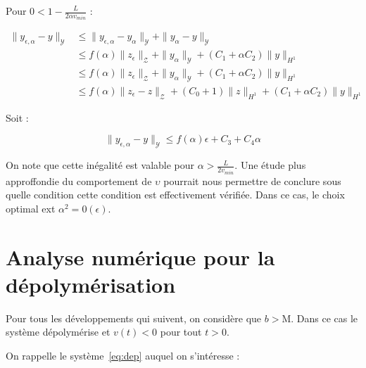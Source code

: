 \documentclass[a4paper]{article}
\newcommand{\mass}{\mathrm{M}}
\newcommand{\dep}{b}
\newcommand{\Y}{\mathscr{Y}}
\newcommand{\Z}{\mathscr{Z}}
\newcommand{\yea}{y_{\epsilon, \alpha}}
\begin{document}
Pour $0< 1-\displaystyle \frac{L}{2\alpha v_{min}} $ :

\[
\begin{split}
	\| \yea - y \|_{\Y} & \leq \| \yea - y_\alpha \|_{\Y} + \| y_\alpha - y \|_{\Y}\\ 	                                             & \leq f(\alpha) \| z_\epsilon \|_{\Z} 
	                          + \| y_\alpha \|_{\Y} + (C_1 + \alpha C_2) \| y \|_{H^1}\\
	                    & \leq f(\alpha) \| z_\epsilon \|_{\Z} + \| y_\alpha \|_{\Y} 
						      + (C_1 + \alpha C_2) \| y \|_{H^1}\\
	  	              & \leq f(\alpha) \| z_\epsilon - z \|_{\Z} 
					         + (C_0 +1) \| z \|_{H^1} 
	  						 + (C_1 + \alpha C_2) \| y \|_{H^1}
\end{split}
\]

Soit :

\[ \| \yea - y \|_{\Y} \leq f(\alpha) \epsilon + C_3 +C_4 \alpha \]

On note que cette inégalité est valable pour $\alpha > \displaystyle \frac{L}{2 v_{min}}$.
Une étude plus approffondie du comportement de $\upsilon$ pourrait nous permettre de conclure sous quelle condition cette condition est effectivement vérifiée.
Dans ce cas, le choix optimal ext $\alpha^2 = 0(\epsilon)$.




\section{Analyse numérique pour la dépolymérisation}

Pour tous les développements qui suivent, on considère que $\dep>\mass$. Dans ce cas le système dépolymérise et $v(t)<0$ pour tout $t>0$.

On rappelle le système~\eqref{eq:dep} auquel on s'intéresse :
\end{document}
